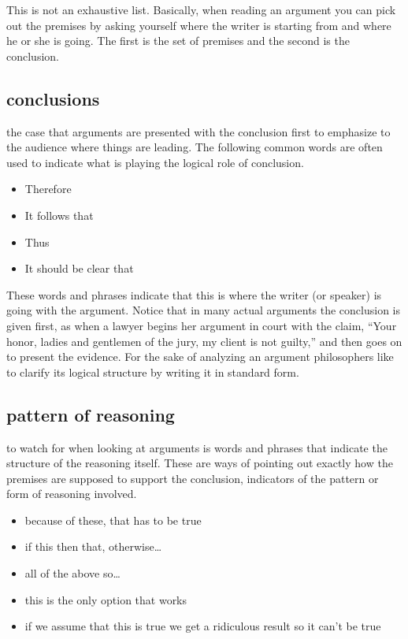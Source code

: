 \documentclass[justified]{tufte-book}
\providecommand{\tightlist}{%
  \setlength{\itemsep}{0pt}\setlength{\parskip}{0pt}}
\begin{document}
This is not an exhaustive list. Basically, when reading an argument you can pick out the premises by asking yourself where the writer is starting from and where he or she is going. The first is the set of premises and the second is the conclusion.

\hypertarget{conclusions}{%
\subsection*{conclusions}\label{conclusions}}

 the case that arguments are presented with the conclusion first to emphasize to the audience where things are leading. The following common words are often used to indicate what is playing the logical role of conclusion.

\begin{itemize}
\tightlist
\item
  Therefore
\item
  It follows that
\item
  Thus
\item
  It should be clear that
\end{itemize}

These words and phrases indicate that this is where the writer (or speaker) is going with the argument. Notice that in many actual arguments the conclusion is given first, as when a lawyer begins her argument in court with the claim, ``Your honor, ladies and gentlemen of the jury, my client is not guilty,'' and then goes on to present the evidence. For the sake of analyzing an argument philosophers like to clarify its logical structure by writing it in standard form.

\hypertarget{pattern-of-reasoning}{%
\subsection*{pattern of reasoning}\label{pattern-of-reasoning}}

 to watch for when looking at arguments is words and phrases that indicate the structure of the reasoning itself. These are ways of pointing out exactly how the premises are supposed to support the conclusion, indicators of the pattern or form of reasoning involved.

\begin{itemize}
\tightlist
\item
  because of these, that has to be true
\item
  if this then that, otherwise\ldots{}
\item
  all of the above so\ldots{}
\item
  this is the only option that works
\item
  if we assume that this is true we get a ridiculous result so it can't be true
\end{itemize}
\end{document}
